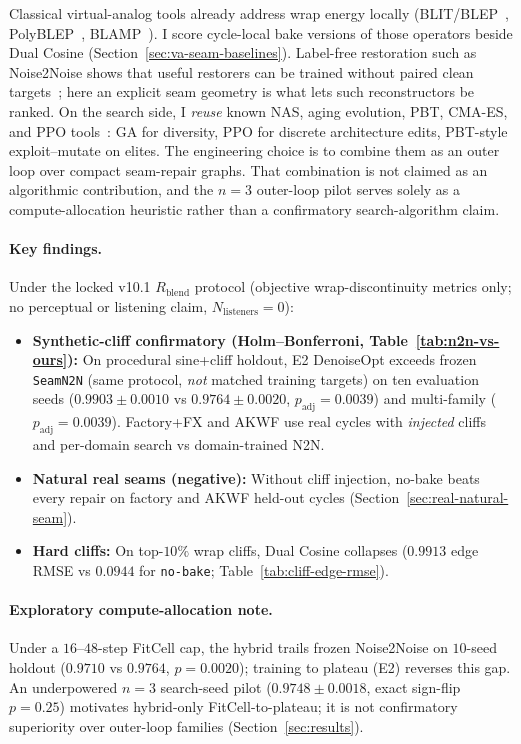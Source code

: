 Classical virtual-analog tools already address wrap energy locally
(BLIT/BLEP~\cite{stilson1996,valimaki2007polyblep}, PolyBLEP~\cite{valimaki2007polyblep}, BLAMP~\cite{esqueda2016blamp}).
I score cycle-local bake versions of those operators beside Dual Cosine (Section~\ref{sec:va-seam-baselines}).
Label-free restoration such as Noise2Noise shows that useful restorers can be trained without paired clean targets~\cite{lehtinen2018,kashyap2021n2n}; here an explicit seam geometry is what lets such reconstructors be ranked.
On the search side, I \emph{reuse} known NAS, aging evolution, PBT, CMA-ES, and PPO tools~\cite{elsken2019,real2019,jaderberg2017,hansen2016cmaes,schulman2017,khadka2018}: GA for diversity, PPO for discrete architecture edits, PBT-style exploit--mutate on elites.
The engineering choice is to combine them as an outer loop over compact seam-repair graphs. That combination is not claimed as an algorithmic contribution, and the $n{=}3$ outer-loop pilot serves solely as a compute-allocation heuristic rather than a confirmatory search-algorithm claim.

\paragraph{Key findings.}
Under the locked v10.1 $R_{\mathrm{blend}}$ protocol (objective wrap-discontinuity metrics only; no perceptual or listening claim, $N_{\mathrm{listeners}}{=}0$):
\begin{itemize}
  \item \textbf{Synthetic-cliff confirmatory (Holm--Bonferroni, Table~\ref{tab:n2n-vs-ours}):} On procedural sine+cliff holdout, E2 DenoiseOpt exceeds frozen \texttt{SeamN2N} (same protocol, \emph{not} matched training targets) on ten evaluation seeds ($0.9903{\pm}0.0010$ vs $0.9764{\pm}0.0020$, $p_{\mathrm{adj}}{=}0.0039$) and multi-family ($p_{\mathrm{adj}}{=}0.0039$).
  Factory+FX and AKWF use real cycles with \emph{injected} cliffs and per-domain search vs domain-trained N2N.
  \item \textbf{Natural real seams (negative):} Without cliff injection, no-bake beats every repair on factory and AKWF held-out cycles (Section~\ref{sec:real-natural-seam}).
  \item \textbf{Hard cliffs:} On top-$10\%$ wrap cliffs, Dual Cosine collapses ($0.9913$ edge RMSE vs $0.0944$ for \texttt{no-bake}; Table~\ref{tab:cliff-edge-rmse}).
\end{itemize}
\paragraph{Exploratory compute-allocation note.}
Under a $16$--$48$-step FitCell cap, the hybrid trails frozen Noise2Noise on $10$-seed holdout ($0.9710$ vs $0.9764$, $p{=}0.0020$); training to plateau (E2) reverses this gap.
An underpowered $n{=}3$ search-seed pilot ($0.9748{\pm}0.0018$, exact sign-flip $p{=}0.25$) motivates hybrid-only FitCell-to-plateau; it is not confirmatory superiority over outer-loop families (Section~\ref{sec:results}).
